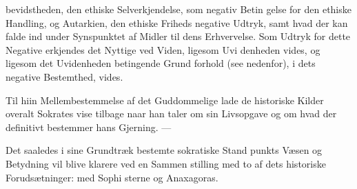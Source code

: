 \documentclass[12pt,a4paper]{book}
\begin{document}
bevidstheden, den ethiske Selverkjendelse, som negativ Betin\-%
gelse for den ethiske Handling, og Autarkien, den ethiske
Friheds negative Udtryk, samt hvad der kan falde ind under
Synspunktet af Midler til dens Erhvervelse. Som Udtryk for
dette Negative erkjendes det Nyttige ved Viden, ligesom Uvi\-%
denheden vides, og ligesom det Uvidenheden betingende Grund\-%
forhold (see nedenfor), i dets negative Bestemthed, vides.

Til hiin Mellembestemmelse af det Guddommelige lade de
historiske Kilder overalt Sokrates vise tilbage naar han taler
om sin Livsopgave og om hvad der definitivt bestemmer hans
Gjerning. ---

Det saaledes i sine Grundtræk bestemte sokratiske Stand\-%
punkts Væsen og Betydning vil blive klarere ved en Sammen\-%
stilling med to af dets historiske Forudsætninger: med Sophi\-%
sterne og Anaxagoras.
\end{document}
